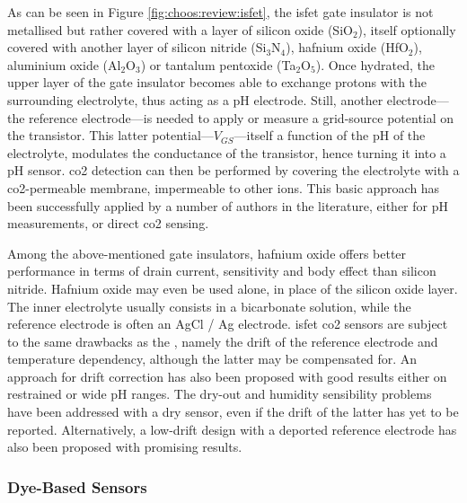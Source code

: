 As can be seen in Figure \ref{fig:choos:review:isfet}, the \gls{isfet} gate insulator is not metallised but rather covered with a layer of silicon oxide (SiO$_2$), itself optionally covered with another layer of silicon nitride (Si$_3$N$_4$), hafnium oxide (HfO$_2$), aluminium oxide (Al$_2$O$_3$) or tantalum pentoxide (Ta$_2$O$_5$). Once hydrated, the upper layer of the gate insulator becomes able to exchange protons with the surrounding electrolyte, thus acting as a pH electrode. Still, another electrode---the reference electrode---is needed to apply or measure a grid-source potential on the transistor. This latter potential---$V_{GS}$---itself a function of the pH of the electrolyte, modulates the conductance of the transistor, hence turning it into a pH sensor\cite{bergveld1981}. \gls{co2} detection can then be performed by covering the electrolyte with a \gls{co2}-permeable membrane, impermeable to other ions. This basic approach has been successfully applied by a number of authors in the literature, either for pH measurements\cite{hu1989, jamasb2019}, or direct \gls{co2} sensing\cite{star2004, mohri2006, shitashima2010, ekwinska2012}.

Among the above-mentioned gate insulators, hafnium oxide offers better performance in terms of drain current, sensitivity and body effect than silicon nitride. Hafnium oxide may even be used alone, in place of the silicon oxide layer\cite{lai2010}. The inner electrolyte usually consists in a bicarbonate solution, while the reference electrode is often an AgCl / Ag electrode. \gls{isfet} \gls{co2} sensors are subject to the same drawbacks as the \ssel, namely the drift of the reference electrode and temperature dependency, although the latter may be compensated for. An approach for drift correction has also been proposed with good results either on restrained\cite{jamasb2019} or wide pH ranges\cite{sinha2020}. The dry-out and humidity sensibility problems have been addressed with a dry sensor\cite{shimanoe2004}, even if the drift of the latter has yet to be reported. Alternatively, a low-drift design with a deported reference electrode has also been proposed with promising results\cite{hsieh2014}.

\subsubsection{Dye-Based Sensors}\label{subsect:choos:review:dye_based}


